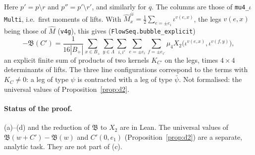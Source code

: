 \documentclass[11pt]{amsart}
\theoremstyle{definition}
\theoremstyle{remark}
\numberwithin{equation}{section}
\begin{document}
Here $p'=p\setminus r$ and $p''=p'\setminus r'$, and similarly for $q$. The columns are those of
\texttt{mu4\_$\iota$Multi}, i.e.\ first moments of lifts. With
$\hat M^{ii}_x=\frac12\sum_{e=\pm e_i}\iota^{v(e,x)}$, the legs $v(e,x)$ being those of $\hat M$
(\texttt{v4g}), this gives (\texttt{FlowSeq.bubble\_explicit})
\[
  -\mathfrak B(C')=\frac1{16|B_+|}\sum_{x\in B_+}\sum_{y\in\Lambda}\sum_{i,i'}\sum_{e=\pm e_i}\sum_{f=\pm e_{i'}}
    \mu_4X_2\bigl(\iota^{v(e,x)},\iota^{v(f,y)}\bigr),
\]
an explicit finite sum of products of two kernels $K_{C'}$ on the legs, times $4\times4$
determinants of lifts. The three line configurations correspond to the terms with $K_C\ne0$:
a leg of type $\psi$ is contracted with a leg of type $\bar\psi$. Not formalised: the universal
values of Proposition~\ref{prop:d2}.

\paragraph{Status of the proof.} (a)--(d) and the reduction of $\mathfrak B$ to $X_2$ are in Lean.
The universal values of $\mathfrak B(w+C')-\mathfrak B(w)$ and $C'(0,e_1)$ (Proposition~\ref{prop:d2})
are a separate, analytic task. They are not part of (c).
\end{document}
